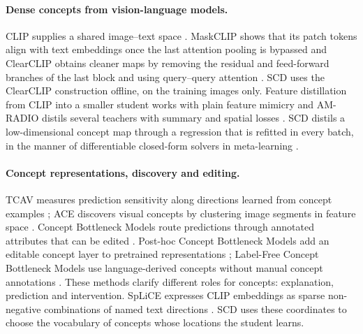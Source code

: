 \documentclass{article}
\begin{document}
\paragraph{Dense concepts from vision-language models.}
CLIP supplies a shared image--text space \citep{radford2021clip}. MaskCLIP shows that its patch tokens align with text embeddings once the last attention pooling is bypassed \citep{zhou2022maskclip} and ClearCLIP obtains cleaner maps by removing the residual and feed-forward branches of the last block and using query--query attention \citep{lan2024clearclip}. SCD uses the ClearCLIP construction offline, on the training images only. Feature distillation from CLIP into a smaller student works with plain feature mimicry \citep{yang2024clipkd} and AM-RADIO distils several teachers with summary and spatial losses \citep{ranzinger2024radio}. SCD distils a low-dimensional concept map through a regression that is refitted in every batch, in the manner of differentiable closed-form solvers in meta-learning \citep{bertinetto2019r2d2,lee2019metaoptnet}.

\paragraph{Concept representations, discovery and editing.}
TCAV measures prediction sensitivity along directions learned from concept examples \citep{kim2018tcav}; ACE discovers visual concepts by clustering image segments in feature space \citep{ghorbani2019ace}. Concept Bottleneck Models route predictions through annotated attributes that can be edited \citep{koh2020cbm}. Post-hoc Concept Bottleneck Models add an editable concept layer to pretrained representations \citep{yuksekgonul2023pcb}; Label-Free Concept Bottleneck Models use language-derived concepts without manual concept annotations \citep{oikarinen2023lfcbm}. These methods clarify different roles for concepts: explanation, prediction and intervention. SpLiCE expresses CLIP embeddings as sparse non-negative combinations of named text directions \citep{bhalla2024splice}. SCD uses these coordinates to choose the vocabulary of concepts whose locations the student learns.
\end{document}
